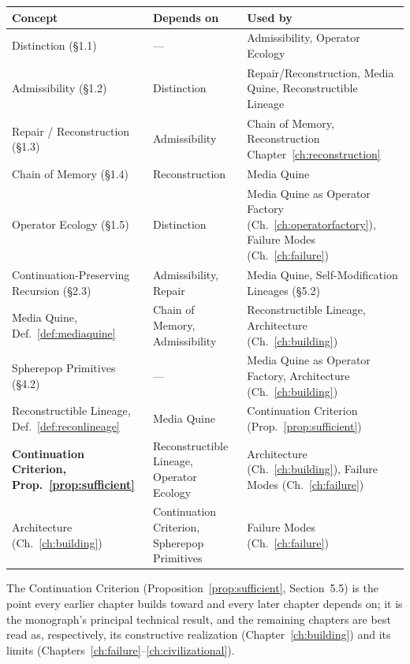 \documentclass[11pt]{book}
\begin{document}
\begingroup
\renewcommand{\arraystretch}{1.3}
\begin{center}
\begin{tabular}{@{}>{\raggedright\arraybackslash}p{3.6cm}>{\raggedright\arraybackslash}p{4.6cm}>{\raggedright\arraybackslash}p{4.6cm}@{}}
\toprule
\textbf{Concept} & \textbf{Depends on} & \textbf{Used by} \\
\midrule
Distinction (\S1.1) & --- & Admissibility, Operator Ecology \\
Admissibility (\S1.2) & Distinction & Repair/Reconstruction, Media Quine, Reconstructible Lineage \\
Repair / Reconstruction (\S1.3) & Admissibility & Chain of Memory, Reconstruction Chapter~\ref{ch:reconstruction} \\
Chain of Memory (\S1.4) & Reconstruction & Media Quine \\
Operator Ecology (\S1.5) & Distinction & Media Quine as Operator Factory (Ch.~\ref{ch:operatorfactory}), Failure Modes (Ch.~\ref{ch:failure}) \\
Continuation-Preserving Recursion (\S2.3) & Admissibility, Repair & Media Quine, Self-Modification Lineages (\S5.2) \\
Media Quine, Def.~\ref{def:mediaquine} & Chain of Memory, Admissibility & Reconstructible Lineage, Architecture (Ch.~\ref{ch:building}) \\
Spherepop Primitives (\S4.2) & --- & Media Quine as Operator Factory, Architecture (Ch.~\ref{ch:building}) \\
Reconstructible Lineage, Def.~\ref{def:reconlineage} & Media Quine & Continuation Criterion (Prop.~\ref{prop:sufficient}) \\
\textbf{Continuation Criterion, Prop.~\ref{prop:sufficient}} & Reconstructible Lineage, Operator Ecology & Architecture (Ch.~\ref{ch:building}), Failure Modes (Ch.~\ref{ch:failure}) \\
Architecture (Ch.~\ref{ch:building}) & Continuation Criterion, Spherepop Primitives & Failure Modes (Ch.~\ref{ch:failure}) \\
\bottomrule
\end{tabular}
\end{center}
\endgroup

\noindent
The Continuation Criterion (Proposition~\ref{prop:sufficient}, Section~5.5) is the point every earlier chapter builds toward and every later chapter depends on; it is the monograph's principal technical result, and the remaining chapters are best read as, respectively, its constructive realization (Chapter~\ref{ch:building}) and its limits (Chapters~\ref{ch:failure}--\ref{ch:civilizational}).
\end{document}
